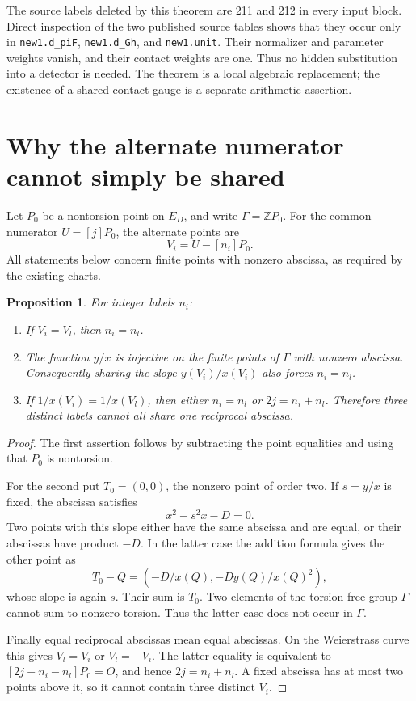 \documentclass[11pt]{article}
\newtheorem{proposition}[theorem]{Proposition}
\newcommand{\Z}{\mathbb Z}
\begin{document}
The source labels deleted by this theorem are
211 and 212 in every input block. Direct inspection of
the two published source tables shows that they occur
only in \texttt{new1.d\_piF},
\texttt{new1.d\_Gh}, and \texttt{new1.unit}.
Their normalizer and parameter weights vanish, and their
contact weights are one. Thus no hidden substitution
into a detector is needed. The theorem is a local
algebraic replacement; the existence of a shared contact
gauge is a separate arithmetic assertion.

\section{Why the alternate numerator cannot simply be shared}

Let \(P_0\) be a nontorsion point on \(E_D\), and write
\(\Gamma=\Z P_0\). For the common numerator
\(U=[j]P_0\), the alternate points are
\[
                         V_i=U-[n_i]P_0.
\]
All statements below concern finite points with nonzero
abscissa, as required by the existing charts.

\begin{proposition}\label{prop:alternate}
For integer labels \(n_i\):
\begin{enumerate}
\item If \(V_i=V_l\), then \(n_i=n_l\).
\item The function \(y/x\) is injective on the finite
points of \(\Gamma\) with nonzero abscissa. Consequently
sharing the slope \(y(V_i)/x(V_i)\) also forces \(n_i=n_l\).
\item If \(1/x(V_i)=1/x(V_l)\), then either \(n_i=n_l\)
or \(2j=n_i+n_l\). Therefore three distinct labels
cannot all share one reciprocal abscissa.
\end{enumerate}
\end{proposition}
\begin{proof}
The first assertion follows by subtracting the point
equalities and using that \(P_0\) is nontorsion.

For the second put \(T_0=(0,0)\), the nonzero point
of order two. If \(s=y/x\) is fixed, the abscissa
satisfies
\[
                         x^2-s^2x-D=0.
\]
Two points with this slope either have the same
abscissa and are equal, or their abscissas have
product \(-D\). In the latter case the addition
formula gives the other point as
\[
            T_0-Q=\left(-D/x(Q),-Dy(Q)/x(Q)^2\right),
\]
whose slope is again \(s\). Their sum is \(T_0\).
Two elements of the torsion-free group \(\Gamma\)
cannot sum to nonzero torsion. Thus the latter case
does not occur in \(\Gamma\).

Finally equal reciprocal abscissas mean equal
abscissas. On the Weierstrass curve this gives
\(V_l=V_i\) or \(V_l=-V_i\).
The latter equality is equivalent to
\([2j-n_i-n_l]P_0=O\), and hence
\(2j=n_i+n_l\). A fixed abscissa has at most two
points above it, so it cannot contain three distinct
\(V_i\).
\end{proof}
\end{document}
